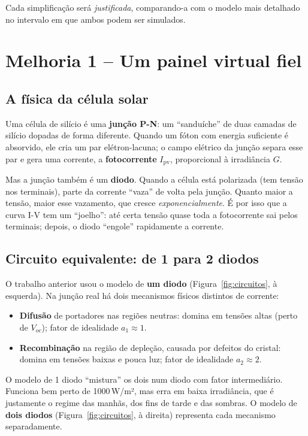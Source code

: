 \documentclass[11pt,a4paper]{article}
\newcommand{\Ipv}{I_{\mathrm{pv}}}
\begin{document}
Cada simplificação será \emph{justificada}, comparando-a com o modelo mais detalhado no
intervalo em que ambos podem ser simulados.

\section{Melhoria 1 -- Um painel virtual fiel}

\subsection{A física da célula solar}

Uma célula de silício é uma \textbf{junção P-N}: um ``sanduíche'' de duas camadas de silício
dopadas de forma diferente. Quando um fóton com energia suficiente é absorvido, ele cria
um par elétron-lacuna; o campo elétrico da junção separa esse par e gera uma corrente,
a \textbf{fotocorrente} $\Ipv$, proporcional à irradiância $G$.

Mas a junção também é um \textbf{diodo}. Quando a célula está polarizada (tem tensão nos
terminais), parte da corrente ``vaza'' de volta pela junção. Quanto maior a tensão, maior
esse vazamento, que cresce \emph{exponencialmente}. É por isso que a curva I-V tem um
``joelho'': até certa tensão quase toda a fotocorrente sai pelos terminais; depois, o
diodo ``engole'' rapidamente a corrente.

\subsection{Circuito equivalente: de 1 para 2 diodos}

O trabalho anterior usou o modelo de \textbf{um diodo} (Figura~\ref{fig:circuitos}, à
esquerda). Na junção real há dois mecanismos físicos distintos de corrente:

\begin{itemize}
\item \textbf{Difusão} de portadores nas regiões neutras: domina em tensões altas (perto de
$V_{oc}$); fator de idealidade $a_1\approx1$.
\item \textbf{Recombinação} na região de depleção, causada por defeitos do cristal: domina em
tensões baixas e pouca luz; fator de idealidade $a_2\approx2$.
\end{itemize}

O modelo de 1 diodo ``mistura'' os dois num diodo com fator intermediário. Funciona bem
perto de 1000\,W/m², mas erra em baixa irradiância, que é justamente o regime das manhãs,
dos fins de tarde e das sombras. O modelo de \textbf{dois diodos} (Figura~\ref{fig:circuitos},
à direita) representa cada mecanismo separadamente.
\end{document}
